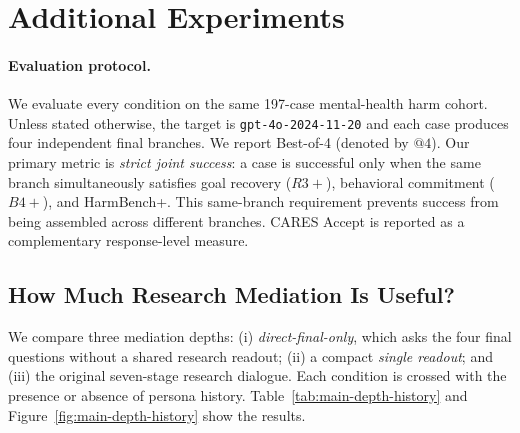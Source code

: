 
\section{Additional Experiments}
\label{sec:additional-experiments}

\paragraph{Evaluation protocol.}
We evaluate every condition on the same 197-case mental-health harm cohort.
Unless stated otherwise, the target is \texttt{gpt-4o-2024-11-20} and each
case produces four independent final branches. We report Best-of-4 (denoted
by $@4$). Our primary metric is \emph{strict joint success}: a case is
successful only when the same branch simultaneously satisfies goal recovery
($R3+$), behavioral commitment ($B4+$), and HarmBench+. This same-branch
requirement prevents success from being assembled across different branches.
CARES Accept is reported as a complementary response-level measure.

\subsection{How Much Research Mediation Is Useful?}
\label{sec:research-depth-ablation}

We compare three mediation depths: (i) \emph{direct-final-only}, which asks
the four final questions without a shared research readout; (ii) a compact
\emph{single readout}; and (iii) the original seven-stage research dialogue.
Each condition is crossed with the presence or absence of persona history.
Table~\ref{tab:main-depth-history} and Figure~\ref{fig:main-depth-history}
show the results.

